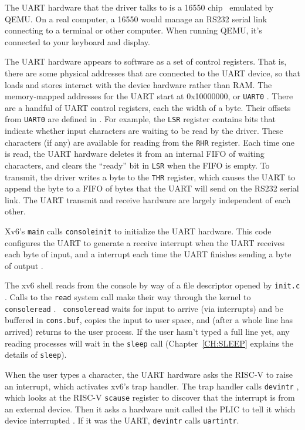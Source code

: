 The UART hardware that the driver talks to is a 16550
chip~\cite{ns16550a} emulated by QEMU. On a real computer, a 16550
would manage an RS232 serial link connecting to a terminal or other
computer. When running QEMU, it's connected to your keyboard and
display.

The UART hardware appears to software as a set of 
control registers. That is, there are some physical addresses that 
are connected to the UART device, so that loads and stores
interact with the device hardware rather than RAM.
The memory-mapped addresses for the UART start at 0x10000000, or {\tt UART0}
.
There are a handful of UART control registers, each the width
of a byte. Their offsets from {\tt UART0} are defined in
. For example, the
{\tt LSR} register contains bits that indicate whether input
characters are waiting to be read by the driver. These
characters (if any) are available for reading from the
{\tt RHR} register. Each time one is read, the UART hardware
deletes it from an internal FIFO of waiting characters, and
clears the ``ready'' bit in {\tt LSR} when the FIFO is empty.
To transmit, the driver writes a byte to the {\tt THR} register,
which causes the UART to append the byte to a FIFO of bytes that the
UART will send on the RS232 serial link.
The UART transmit and receive hardware are largely independent
of each other.

Xv6's {\tt main} calls {\tt consoleinit}
 to initialize the UART
hardware. This code configures the UART to generate 
a receive 
interrupt when the UART receives each byte of input, and
a  interrupt each time the
UART finishes sending a byte of output .

The xv6 shell reads from the console by way of a file descriptor
opened by {\tt init.c} . Calls to
the {\tt read} system call make their way through the kernel to {\tt
  consoleread} . {\tt
  consoleread} waits for input to arrive (via interrupts) and be
buffered in {\tt cons.buf}, copies the input to user space, and (after
a whole line has arrived) returns to the user process. If the user
hasn't typed a full line yet, any reading processes will wait in the
{\tt sleep} call
(Chapter~\ref{CH:SLEEP} explains the details of {\tt sleep}).

When the user types a character, the UART hardware asks the RISC-V
to raise an interrupt, which activates
xv6's trap handler.
The trap handler calls {\tt devintr}
,
which looks at the RISC-V {\tt scause} register to discover that
the interrupt is from an external device.
Then it asks a hardware unit called the PLIC
\cite{riscv:priv}
to tell it which device interrupted
.
If it was the UART, {\tt devintr} calls {\tt uartintr}.

